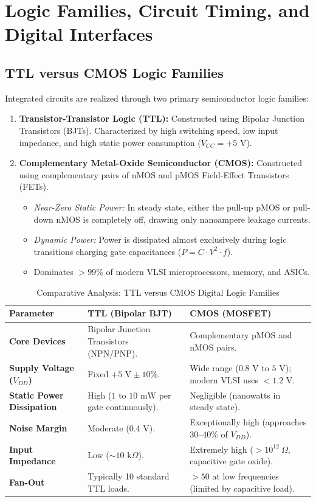 \section{Logic Families, Circuit Timing, and Digital Interfaces}
\label{sec:logic_families}

\subsection{TTL versus CMOS Logic Families}
Integrated circuits are realized through two primary semiconductor logic families:
\begin{enumerate}[label=\bfseries\arabic*.]
    \item \textbf{Transistor-Transistor Logic (TTL):} Constructed using Bipolar Junction Transistors (BJTs). Characterized by high switching speed, low input impedance, and high static power consumption ($V_{CC} = +5\text{ V}$).
    \item \textbf{Complementary Metal-Oxide Semiconductor (CMOS):} Constructed using complementary pairs of nMOS and pMOS Field-Effect Transistors (FETs).
    \begin{itemize}
        \item \textit{Near-Zero Static Power:} In steady state, either the pull-up pMOS or pull-down nMOS is completely off, drawing only nanoampere leakage currents.
        \item \textit{Dynamic Power:} Power is dissipated almost exclusively during logic transitions charging gate capacitances ($P = C \cdot V^2 \cdot f$).
        \item Dominates $>99\%$ of modern VLSI microprocessors, memory, and ASICs.
    \end{itemize}
\end{enumerate}

\begin{table}[htbp]
\centering
\small
\caption{Comparative Analysis: TTL versus CMOS Digital Logic Families}
\label{tab:ttl_vs_cmos}
\begin{tabularx}{\textwidth}{l X X}
\toprule
\textbf{Parameter} & \textbf{TTL (Bipolar BJT)} & \textbf{CMOS (MOSFET)} \\
\midrule
\textbf{Core Devices} & Bipolar Junction Transistors (NPN/PNP). & Complementary pMOS and nMOS pairs. \\
\textbf{Supply Voltage ($V_{DD}$)} & Fixed $+5\text{ V} \pm 10\%$. & Wide range ($0.8\text{ V}$ to $5\text{ V}$); modern VLSI uses $<1.2\text{ V}$. \\
\textbf{Static Power Dissipation} & High ($1$ to $10\text{ mW}$ per gate continuously). & Negligible (nanowatts in steady state). \\
\textbf{Noise Margin} & Moderate ($0.4\text{ V}$). & Exceptionally high (approaches $30$--$40\%$ of $V_{DD}$). \\
\textbf{Input Impedance} & Low ($\sim 10\text{ k}\Omega$). & Extremely high ($>10^{12}\ \Omega$, capacitive gate oxide). \\
\textbf{Fan-Out} & Typically 10 standard TTL loads. & $>50$ at low frequencies (limited by capacitive load). \\
\bottomrule
\end{tabularx}
\end{table}

